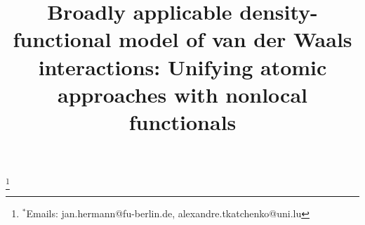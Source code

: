

\title{Broadly applicable density-functional model of van der Waals interactions: Unifying atomic approaches with nonlocal functionals}




\begingroup
\renewcommand\thefootnote{}\footnote{$^*$Emails: jan.hermann@fu-berlin.de, alexandre.tkatchenko@uni.lu}%
\addtocounter{footnote}{-1}%
\endgroup



\begingroup
\setlength\bibsep{0pt}
\renewcommand{\section}[2]{}
\footnotesize

\endgroup


